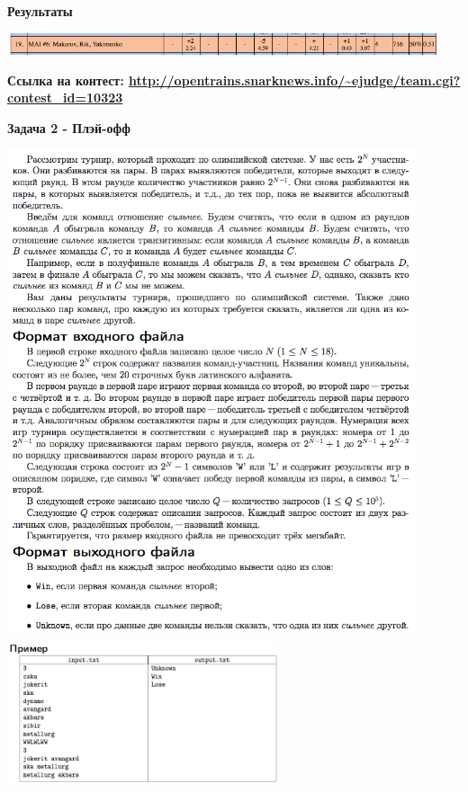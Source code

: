 \documentclass[a4paper,12pt]{article}
\begin{document}
\textbf{{\large Результаты}} \\
\begin{center}
\includegraphics[width=0.95\textwidth]{OC_Eurasia/result.png}\\ [1cm]
\end{center}

\textbf{{\large Ссылка на контест: \url{http://opentrains.snarknews.info/~ejudge/team.cgi?contest_id=10323}}}

\newpage
\textbf{{\large Задача 2 - Плэй-офф}}

\begin{center}
\includegraphics[width=0.9\textwidth]{OC_Eurasia/2_1.png}\\ [1cm]
\includegraphics[width=0.6\textwidth]{OC_Eurasia/2_2.png}\\ [1cm]
\end{center}
\end{document}
